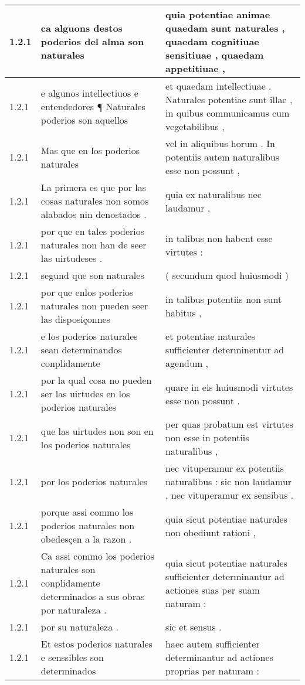 \begin{tabular}{|p{1cm}|p{6.5cm}|p{6.5cm}|}
1.2.1 & ca alguons destos poderios del alma son naturales & quia potentiae animae quaedam sunt naturales , quaedam cognitiuae sensitiuae , quaedam appetitiuae , \\\hline
1.2.1 & e algunos intellectiuos e entendedores ¶ Naturales poderios son aquellos & et quaedam intellectiuae . Naturales potentiae sunt illae , in quibus communicamus cum vegetabilibus , \\\hline
1.2.1 & Mas que en los poderios naturales & vel in aliquibus horum . In potentiis autem naturalibus esse non possunt , \\\hline
1.2.1 & La primera es que por las cosas naturales non somos alabados nin denostados . & quia ex naturalibus nec laudamur , \\\hline
1.2.1 & por que en tales poderios naturales non han de seer las uirtudeses . & in talibus non habent esse virtutes : \\\hline
1.2.1 & segund que son naturales & ( secundum quod huiusmodi ) \\\hline
1.2.1 & por que enlos poderios naturales non pueden seer las disposiçonnes & in talibus potentiis non sunt habitus , \\\hline
1.2.1 & e los poderios naturales sean determinandos conplidamente & et potentiae naturales sufficienter determinentur ad agendum , \\\hline
1.2.1 & por la qual cosa no pueden ser las uirtudes en los poderios naturales & quare in eis huiusmodi virtutes esse non possunt . \\\hline
1.2.1 & que las uirtudes non son en los poderios naturales & per quas probatum est virtutes non esse in potentiis naturalibus , \\\hline
1.2.1 & por los poderios naturales & nec vituperamur ex potentiis naturalibus : sic non laudamur , nec vituperamur ex sensibus . \\\hline
1.2.1 & porque assi commo los poderios naturales non obedesçen a la razon . & quia sicut potentiae naturales non obediunt rationi , \\\hline
1.2.1 & Ca assi commo los poderios naturales son conplidamente determinados a sus obras por naturaleza . & quia sicut potentiae naturales sufficienter determinantur ad actiones suas per suam naturam : \\\hline
1.2.1 & por su naturaleza . & sic et sensus . \\\hline
1.2.1 & Et estos poderios naturales e senssibles son determinados & haec autem sufficienter determinantur ad actiones proprias per naturam : \\\hline

\end{tabular}
